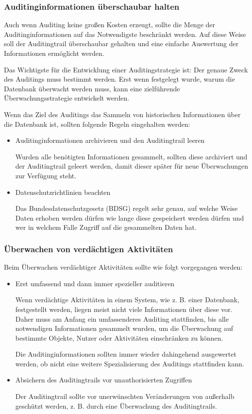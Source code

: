         \subsubsection{Auditinginformationen überschaubar halten}
          Auch wenn Auditing keine großen Kosten erzeugt, sollte die Menge der Auditinginformationen auf das Notwendigste beschränkt werden. Auf diese Weise soll der Auditingtrail überschaubar gehalten und eine einfache Auswertung der Informationen ermöglicht werden.

          Das Wichtigste für die Entwicklung einer Auditingstrategie ist: Der genaue Zweck des Auditings muss bestimmt werden. Erst wenn festgelegt wurde, warum die Datenbank überwacht werden muss, kann eine zielführende Überwachungsstrategie entwickelt werden.

          Wenn das Ziel des Auditings das Sammeln von historischen Informationen über die Datenbank ist, sollten folgende Regeln eingehalten werden:
          \begin{itemize}
            \item Auditinginformationen archivieren und den Auditingtrail leeren

              Wurden alle benötigten Informationen gesammelt, sollten diese archiviert und der Auditingtrail geleert werden, damit dieser später für neue Überwachungen zur Ver\-fü\-gung steht.
            \item Datenschutzrichtlinien beachten
            
              Das Bundesdatenschutzgesetz (BDSG) regelt sehr genau, auf welche
              Weise Daten erhoben werden dürfen wie lange diese gespeichert
              werden dürfen und wer in welchem Falle Zugriff auf die gesammelten
              Daten hat.
          \end{itemize}
        \subsubsection{Überwachen von verdächtigen Aktivitäten}
          Beim Überwachen verdächtiger Aktivitäten sollte wie folgt vorgegangen werden:
          \begin{itemize}
            \item Erst umfassend und dann immer spezieller auditieren

              Wenn verdächtige Aktivitäten in einem System, wie z. B. einer Datenbank, festgestellt werden, liegen meist nicht viele Informationen über diese vor. Daher muss am Anfang ein umfassenderes Auditing stattfinden, bis alle notwendigen Informationen gesammelt wurden, um die Überwachung auf bestimmte Objekte, Nutzer oder Aktivitäten einschränken zu können.

              Die Auditinginformationen sollten immer wieder dahingehend ausgewertet werden, ob nicht eine weitere Spezialisierung des Auditings stattfinden kann.
            \item Absichern des Auditingtrails vor unauthorisierten Zugriffen

              Der Auditingtrail sollte vor unerwünschten Veränderungen von außerhalb ge\-schü\-tzt werden, z. B. durch eine Überwachung des Auditingtrails.
          \end{itemize}
